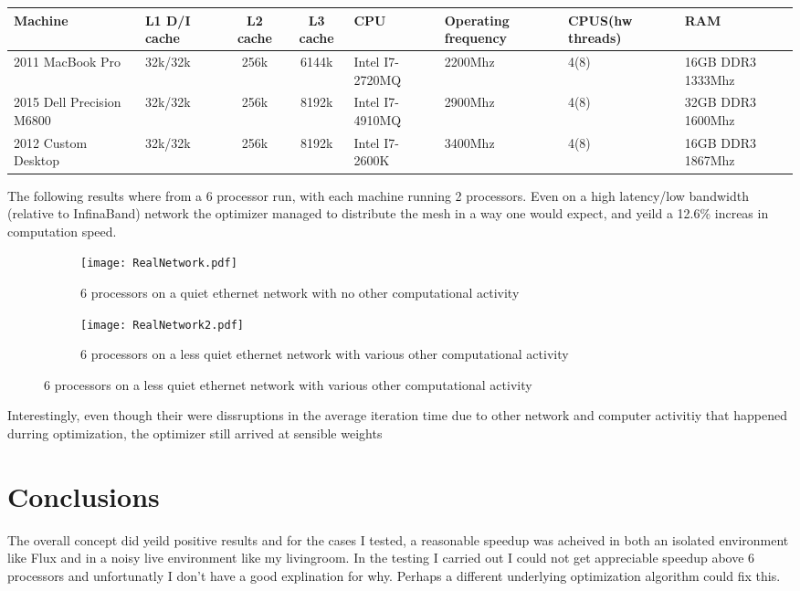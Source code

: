\documentclass[12pt,parskip=full]{article}
\numberwithin{subsection}{section}
\begin{document}
		\begin{centering}
		\begin{tabular}{| m{1.8cm} | m{1.5cm} | c | c | m{1.5cm} | m{2cm} | m{1.8cm} | m{2cm} | }
			\hline
			Machine &	              L1 D/I cache & L2 cache & L3 cache & CPU &	    Operating frequency & CPUS(hw threads) & RAM \\ \hline\hline
			2011 MacBook Pro 	    & 32k/32k      & 256k     & 6144k    & Intel I7-2720MQ & 2200Mhz & 4(8) & 16GB DDR3 1333Mhz \\ \hline
			2015 Dell Precision M6800   & 32k/32k	   & 256k     & 8192k    & Intel I7-4910MQ & 2900Mhz & 4(8) & 32GB DDR3 1600Mhz \\ \hline
			2012 Custom Desktop	    & 32k/32k	   & 256k     & 8192k	 & Intel I7-2600K  & 3400Mhz & 4(8) & 16GB DDR3 1867Mhz \\ \hline
		\end{tabular}
		\end{centering}

		The following results where from a 6 processor run, with each machine running 2 processors. Even on a high latency/low bandwidth (relative to 
		InfinaBand) network the optimizer managed to distribute the mesh in a way one would expect, and yeild a 12.6\% increas in computation speed.
		\begin{figure}[H]
			\centering
			\begin{subfigure}[H]{0.9\textwidth}
				\texttt{[image: RealNetwork.pdf]}
				\caption{6 processors on a quiet ethernet network with no other computational activity}
			\end{subfigure}
			\begin{subfigure}[H]{0.9\textwidth}
				\texttt{[image: RealNetwork2.pdf]}
				\caption{6 processors on a less quiet ethernet network with various other computational activity}
			\end{subfigure}
		\end{figure}
		Interestingly, even though their were dissruptions in the average iteration time due to other network and computer activitiy that happened durring
		optimization, the optimizer still arrived at sensible weights 

	\section{Conclusions}

		The overall concept did yeild positive results and for the cases I tested, a reasonable speedup was acheived in both an isolated environment like Flux
		and in a noisy live environment like my livingroom. In the testing I carried out I could not get appreciable speedup above 6 processors and unfortunatly
		I don't have a good explination for why. Perhaps a different underlying optimization algorithm could fix this. 
		
\end{document}
